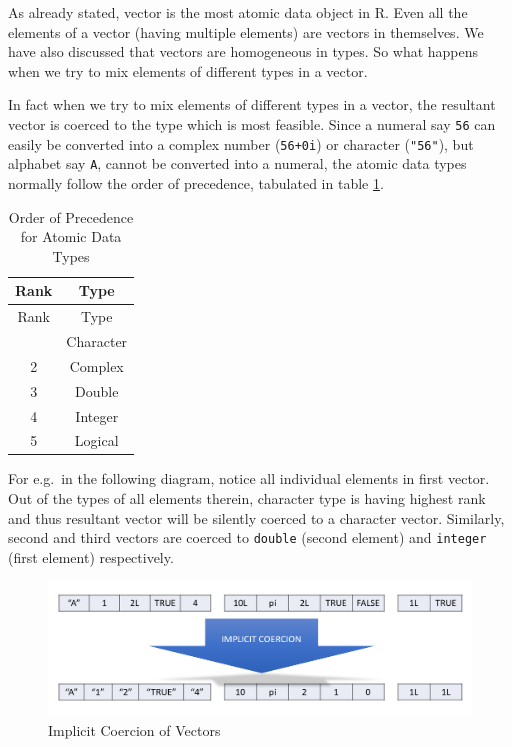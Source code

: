 \documentclass[
]{book}
\begin{document}
As already stated, vector is the most atomic data object in R. Even all the elements of a vector (having multiple elements) are vectors in themselves. We have also discussed that vectors are homogeneous in types. So what happens when we try to mix elements of different types in a vector.

In fact when we try to mix elements of different types in a vector, the resultant vector is coerced to the type which is most feasible. Since a numeral say \texttt{56} can easily be converted into a complex number (\texttt{56+0i}) or character (\texttt{"56"}), but alphabet say \texttt{A}, cannot be converted into a numeral, the atomic data types normally follow the order of precedence, tabulated in table \ref{tab:rank}.

\begin{longtable}[]{@{}cc@{}}
\caption{\label{tab:rank} Order of Precedence for Atomic Data Types}\tabularnewline
\toprule\noalign{}
Rank & Type \\
\midrule\noalign{}
\endfirsthead
\toprule\noalign{}
Rank & Type \\
\midrule\noalign{}
\endhead
\bottomrule\noalign{}
\endlastfoot
1 & Character \\
2 & Complex \\
3 & Double \\
4 & Integer \\
5 & Logical \\
\end{longtable}

For e.g.~in the following diagram, notice all individual elements in first vector. Out of the types of all elements therein, character type is having highest rank and thus resultant vector will be silently coerced to a character vector. Similarly, second and third vectors are coerced to \texttt{double} (second element) and \texttt{integer} (first element) respectively.

\begin{figure}

{\centering \includegraphics[width=0.99\linewidth]{images/implicit_coercion} 

}

\caption{Implicit Coercion of Vectors}\label{fig:impcoer}
\end{figure}
\end{document}
